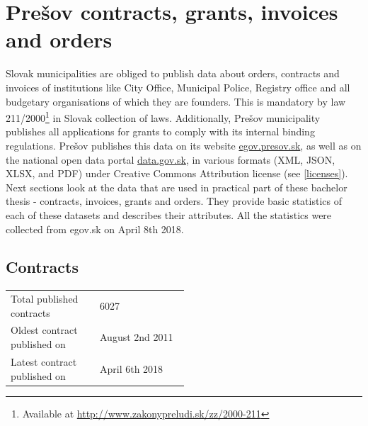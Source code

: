 \documentclass[thesis=B,english]{FITthesis}[2012/06/26]
\begin{document}
	\section{Prešov contracts, grants, invoices and orders}
	\label{presovdataattributes}
	Slovak municipalities are obliged to publish data about orders, contracts and invoices of institutions like City Office, Municipal Police, Registry office and all budgetary organisations of which they are founders. This is mandatory by law 211/2000\footnote{Available at \url{http://www.zakonypreludi.sk/zz/2000-211}} in Slovak collection of laws. Additionally, Prešov municipality  publishes all applications for grants to comply with its internal binding regulations. Prešov publishes this data on its website \url{egov.presov.sk}, as well as on the national open data portal \url{data.gov.sk}, in various formats (XML, JSON, XLSX, and PDF) under Creative Commons Attribution license (see \ref{licenses}). Next sections look at the data that are used in practical part of these bachelor thesis - contracts, invoices, grants and orders. They provide basic statistics of each of these datasets and describes their attributes. All the statistics were collected from egov.sk on April 8th 2018.
	\subsection{Contracts}
        \begin{tabular}{  p{0.5\linewidth}  l }
        \\
        Total published contracts & 6027 \\
        Oldest contract published on & August 2nd 2011\\
        Latest contract published on & April 6th 2018 \\
        \end{tabular}
        
\end{document}
